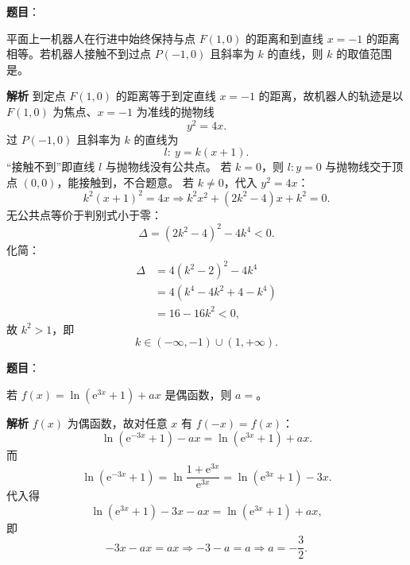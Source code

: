 \begin{answer}

\textbf{题目}：

平面上一机器人在行进中始终保持与点 $F(1,0)$ 的距离和到直线 $x=-1$ 的距离相等。若机器人接触不到过点 $P(-1,0)$ 且斜率为 $k$ 的直线，则 $k$ 的取值范围是\gkblank{}。

\textbf{解析}
到定点 $F(1,0)$ 的距离等于到定直线 $x=-1$ 的距离，故机器人的轨迹是以 $F(1,0)$ 为焦点、$x=-1$ 为准线的抛物线
\nopagebreak[4]
\[y^2=4x .\]
过 $P(-1,0)$ 且斜率为 $k$ 的直线为
\nopagebreak[4]
\[l:\ y=k(x+1).\]
“接触不到”即直线 $l$ 与抛物线没有公共点。
若 $k=0$，则 $l:y=0$ 与抛物线交于顶点 $(0,0)$，能接触到，不合题意。
若 $k\neq0$，代入 $y^2=4x$：
\nopagebreak[4]
\[k^2(x+1)^2=4x\Longrightarrow k^2x^2+(2k^2-4)x+k^2=0 .\]
无公共点等价于判别式小于零：
\nopagebreak[4]
\[\Delta=(2k^2-4)^2-4k^4<0 .\]
化简：
\nopagebreak[4]
\[\begin{aligned}
\Delta&=4(k^2-2)^2-4k^4\\
&=4\left(k^4-4k^2+4-k^4\right)\\
&=16-16k^2<0,
\end{aligned}\]
故 $k^2>1$，即
\nopagebreak[4]
\[k\in(-\infty,-1)\cup(1,+\infty).\]


\end{answer}
\begin{answer}

\textbf{题目}：

若 $f(x)=\ln(\mathrm e^{3x}+1)+ax$ 是偶函数，则 $a=$\gkblank{}。

\textbf{解析}
$f(x)$ 为偶函数，故对任意 $x$ 有 $f(-x)=f(x)$：
\nopagebreak[4]
\[\ln\left(\mathrm e^{-3x}+1\right)-ax=\ln\left(\mathrm e^{3x}+1\right)+ax .\]
而
\nopagebreak[4]
\[\ln\left(\mathrm e^{-3x}+1\right)=\ln\frac{1+\mathrm e^{3x}}{\mathrm e^{3x}}=\ln\left(\mathrm e^{3x}+1\right)-3x .\]
代入得
\nopagebreak[4]
\[\ln\left(\mathrm e^{3x}+1\right)-3x-ax=\ln\left(\mathrm e^{3x}+1\right)+ax,\]
即
\nopagebreak[4]
\[-3x-ax=ax\Longrightarrow-3-a=a\Longrightarrow a=-\frac32 .\]


\end{answer}

